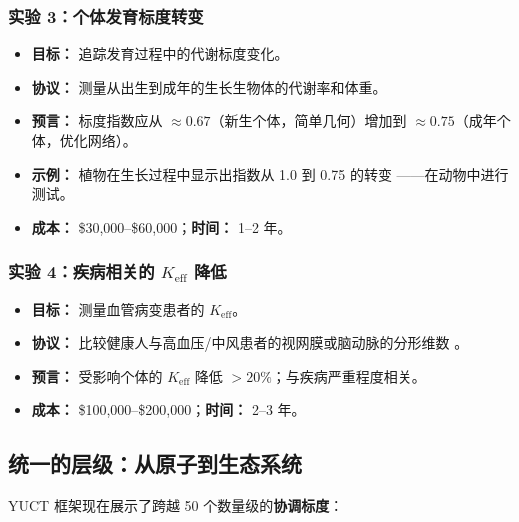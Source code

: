 \documentclass[12pt]{article}
\newcommand{\Keff}{K_{\mathrm{eff}}}
\begin{document}
	\subsubsection{实验 3：个体发育标度转变}
	\begin{itemize}
		\item \textbf{目标：} 追踪发育过程中的代谢标度变化。
		\item \textbf{协议：} 测量从出生到成年的生长生物体的代谢率和体重。
		\item \textbf{预言：} 标度指数应从 \(\approx 0.67\)（新生个体，简单几何）增加到 \(\approx 0.75\)（成年个体，优化网络）\cite{Glazier2005}。
		\item \textbf{示例：} 植物在生长过程中显示出指数从 1.0 到 0.75 的转变 \cite{Reich2006}——在动物中进行测试。
		\item \textbf{成本：} \$30,000–\$60,000；\textbf{时间：} 1–2 年。
	\end{itemize}
	
	\subsubsection{实验 4：疾病相关的 \(\Keff\) 降低}
	\begin{itemize}
		\item \textbf{目标：} 测量血管病变患者的 \(\Keff\)。
		\item \textbf{协议：} 比较健康人与高血压/中风患者的视网膜或脑动脉的分形维数 \cite{Gould1993}。
		\item \textbf{预言：} 受影响个体的 \(\Keff\) 降低 \(>20\%\)；与疾病严重程度相关。
		\item \textbf{成本：} \$100,000–\$200,000；\textbf{时间：} 2–3 年。
	\end{itemize}
	
	\subsection{统一的层级：从原子到生态系统}
	
	YUCT 框架现在展示了跨越 50 个数量级的\textbf{协调标度}：
	
\end{document}
